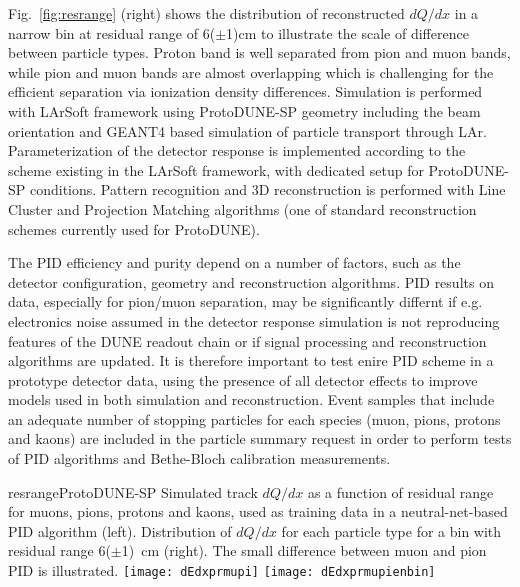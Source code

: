\begin{itemize}
Fig.~\ref{fig:resrange} (right) shows the distribution of reconstructed $dQ/dx$ in a narrow bin at residual range of 6($\pm$1)cm to illustrate the scale of difference between particle types. Proton band is well separated from pion and muon bands, while pion and muon bands are almost overlapping which is challenging for the efficient separation via ionization density differences. 
Simulation is performed with LArSoft framework using ProtoDUNE-SP geometry including the beam orientation and GEANT4 based simulation of particle transport through LAr. Parameterization of the detector response is implemented according to the scheme existing in the LArSoft framework, with dedicated setup for ProtoDUNE-SP conditions. Pattern recognition and 3D reconstruction is performed with Line Cluster and Projection Matching algorithms (one of standard reconstruction schemes currently used for ProtoDUNE).

The PID efficiency and purity depend on a number of factors, such as the detector configuration, geometry and reconstruction algorithms. PID results on data, especially for pion/muon separation, may be significantly differnt if e.g. electronics noise assumed in the detector response simulation is not reproducing features of the DUNE readout chain or if signal processing and reconstruction algorithms are updated. It is therefore important to test enire PID scheme in a prototype detector data, using the presence of all detector effects to improve models used in both simulation and reconstruction. Event samples that include an adequate number of stopping particles for each species
(muon, pions, protons and kaons) are included in the particle summary request in order to perform tests of PID algorithms and Bethe-Bloch calibration measurements.

\begin{cdrfigure}{resrange}{ProtoDUNE-SP Simulated track $dQ/dx$ as a function of residual range for muons, pions, protons and kaons, used as training data in a neutral-net-based PID algorithm (left). Distribution of $dQ/dx$ for each particle type for a bin with residual range 
6($\pm$1)~cm (right). The small difference between muon and pion PID is illustrated.}
\texttt{[image: dEdxprmupi]}
\texttt{[image: dEdxprmupienbin]}
\end{cdrfigure}



\end{itemize}
